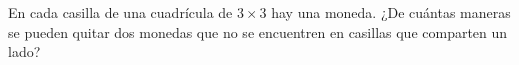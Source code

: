 En cada casilla de una cuadrícula de $3 \times  3$ hay una moneda. ¿De cuántas maneras se pueden quitar dos monedas que no se encuentren en casillas que comparten un lado?